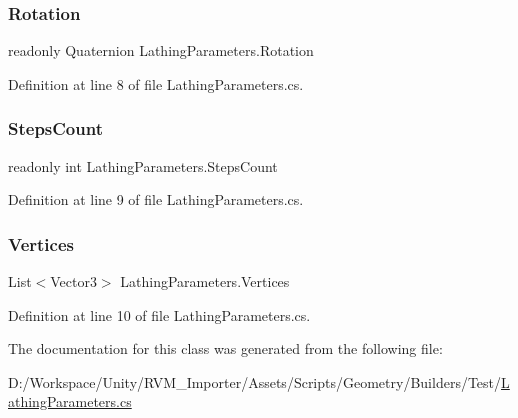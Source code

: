 \subsubsection{\texorpdfstring{Rotation}{Rotation}}
{\footnotesize\ttfamily readonly Quaternion Lathing\+Parameters.\+Rotation}



Definition at line 8 of file Lathing\+Parameters.\+cs.

\mbox{\label{class_lathing_parameters_a374bb79585d4c37fde7a1e362fea7b16}} 
\subsubsection{\texorpdfstring{StepsCount}{StepsCount}}
{\footnotesize\ttfamily readonly int Lathing\+Parameters.\+Steps\+Count}



Definition at line 9 of file Lathing\+Parameters.\+cs.

\mbox{\label{class_lathing_parameters_ae967f66a4402bd77573bf9281b8523c2}} 
\subsubsection{\texorpdfstring{Vertices}{Vertices}}
{\footnotesize\ttfamily List$<$Vector3$>$ Lathing\+Parameters.\+Vertices}



Definition at line 10 of file Lathing\+Parameters.\+cs.



The documentation for this class was generated from the following file\+:\begin{DoxyCompactItemize}
\item 
D\+:/\+Workspace/\+Unity/\+R\+V\+M\+\_\+\+Importer/\+Assets/\+Scripts/\+Geometry/\+Builders/\+Test/\mbox{\hyperlink{_lathing_parameters_8cs}{Lathing\+Parameters.\+cs}}\end{DoxyCompactItemize}
